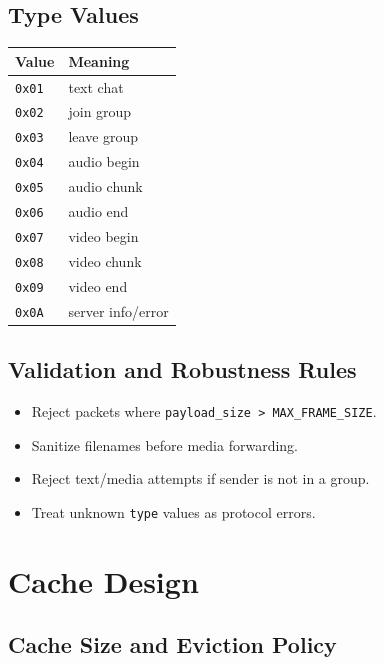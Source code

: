 \documentclass[12pt,letterpaper]{article}
\begin{document}
\subsection{Type Values}

\begin{center}
\begin{tabular}{ll}
\toprule
\textbf{Value} & \textbf{Meaning} \\
\midrule
\texttt{0x01} & text chat \\
\texttt{0x02} & join group \\
\texttt{0x03} & leave group \\
\texttt{0x04} & audio begin \\
\texttt{0x05} & audio chunk \\
\texttt{0x06} & audio end \\
\texttt{0x07} & video begin \\
\texttt{0x08} & video chunk \\
\texttt{0x09} & video end \\
\texttt{0x0A} & server info/error \\
\bottomrule
\end{tabular}
\end{center}

\subsection{Validation and Robustness Rules}

\begin{itemize}[leftmargin=1.5em]
  \item Reject packets where \texttt{payload\_size > MAX\_FRAME\_SIZE}.
  \item Sanitize filenames before media forwarding.
  \item Reject text/media attempts if sender is not in a group.
  \item Treat unknown \texttt{type} values as protocol errors.
\end{itemize}

\section{Cache Design}

\subsection{Cache Size and Eviction Policy}
\end{document}
